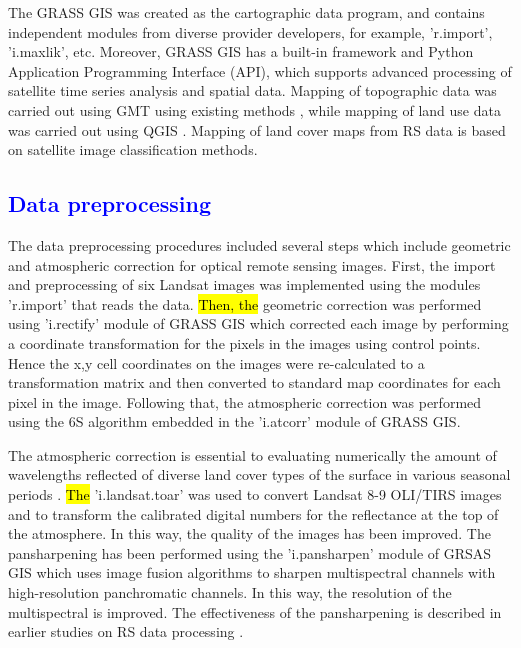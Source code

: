 \documentclass[geomatics,article,submit,pdftex,moreauthors]{Definitions/mdpi}
\begin{document}
The GRASS GIS was created as the cartographic data program, and contains independent modules from diverse provider developers, for example, 'r.import', 'i.maxlik', etc. Moreover, GRASS GIS has a built-in framework and Python Application Programming Interface (API), which supports advanced processing of satellite time series analysis and spatial data. Mapping of topographic data was carried out using GMT using existing methods \cite{Lemenkova202221,BECKER20051075,Lemenkova202217,10537274,5369602}, while mapping of land use data was carried out using QGIS \cite{FANG202031}. Mapping of land cover maps from RS data is based on satellite image classification methods.

\subsection{\textcolor{blue}{Data preprocessing}}
The data preprocessing procedures included several steps which include geometric and atmospheric correction for optical remote sensing images. First, the import and preprocessing of six Landsat images was implemented using the modules 'r.import' that reads the data. \hl{Then, the} geometric correction was performed using 'i.rectify' module of GRASS GIS which corrected each image by performing a coordinate transformation for the pixels in the images using control points. Hence the x,y cell coordinates on the images were re-calculated to a transformation matrix and then converted to standard map coordinates for each pixel in the image. Following that, the atmospheric correction was performed using the 6S algorithm embedded in the 'i.atcorr' module of GRASS GIS. 

The atmospheric correction is essential to evaluating numerically the amount of wavelengths reflected of diverse land cover types of the surface in various seasonal periods \cite{f14071414,ABDELRAHMANHEGAB2024716}. \hl{The} 'i.landsat.toar' was used to convert Landsat 8-9 OLI/TIRS images and to transform the calibrated digital numbers for the reflectance at the top of the atmosphere. In this way, the quality of the images has been improved. The pansharpening has been performed using the 'i.pansharpen' module of GRSAS GIS which uses image fusion algorithms to sharpen multispectral channels with high-resolution panchromatic channels. In this way, the resolution of the multispectral is improved. The effectiveness of the pansharpening is described in earlier studies on RS data processing \cite{rs15082017,rs13173433}.
\end{document}
